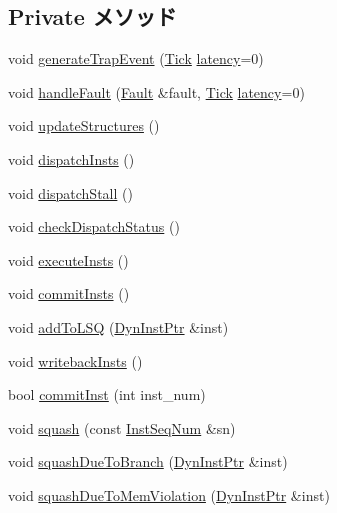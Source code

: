 \subsection*{Private メソッド}
\begin{DoxyCompactItemize}
\item 
void \hyperlink{classLWBackEnd_a17fd6203f0789b68f99f618ea93ab6e0}{generateTrapEvent} (\hyperlink{base_2types_8hh_a5c8ed81b7d238c9083e1037ba6d61643}{Tick} \hyperlink{classLWBackEnd_a9c5bf07170b5d91cfb44d4bfd0517128}{latency}=0)
\item 
void \hyperlink{classLWBackEnd_af3d02b2950c0aaa8cd71d422abd0ef51}{handleFault} (\hyperlink{classRefCountingPtr}{Fault} \&fault, \hyperlink{base_2types_8hh_a5c8ed81b7d238c9083e1037ba6d61643}{Tick} \hyperlink{classLWBackEnd_a9c5bf07170b5d91cfb44d4bfd0517128}{latency}=0)
\item 
void \hyperlink{classLWBackEnd_a1107d388cfcea92a9043608346ce98f0}{updateStructures} ()
\item 
void \hyperlink{classLWBackEnd_ac3f94deccc87588d728716efc4dd7ce8}{dispatchInsts} ()
\item 
void \hyperlink{classLWBackEnd_a3a69629e2b050560eb983bdedffc30ba}{dispatchStall} ()
\item 
void \hyperlink{classLWBackEnd_aee5c9997a61eb30564062dcdbda8c246}{checkDispatchStatus} ()
\item 
void \hyperlink{classLWBackEnd_a2d00e30d66a56e4667e28df302c98ac0}{executeInsts} ()
\item 
void \hyperlink{classLWBackEnd_ac8b85fbfdf330d000c094a9d1886d264}{commitInsts} ()
\item 
void \hyperlink{classLWBackEnd_a1b9c2184abc4f4e7a00285130f39bf26}{addToLSQ} (\hyperlink{classLWBackEnd_a028ce10889c5f6450239d9e9a7347976}{DynInstPtr} \&inst)
\item 
void \hyperlink{classLWBackEnd_a5e9a203f943b3a8a243ddc6d2a0a240d}{writebackInsts} ()
\item 
bool \hyperlink{classLWBackEnd_a300f33ed45badc3c856983b1b7469955}{commitInst} (int inst\_\-num)
\item 
void \hyperlink{classLWBackEnd_adc9b67ce59b0b2e930cfaf6361ce42c5}{squash} (const \hyperlink{inst__seq_8hh_a258d93d98edaedee089435c19ea2ea2e}{InstSeqNum} \&sn)
\item 
void \hyperlink{classLWBackEnd_a05c89a1532adb13cc0632fc3bb600add}{squashDueToBranch} (\hyperlink{classLWBackEnd_a028ce10889c5f6450239d9e9a7347976}{DynInstPtr} \&inst)
\item 
void \hyperlink{classLWBackEnd_a493d3b3596dc6e17cc56990a4e71602d}{squashDueToMemViolation} (\hyperlink{classLWBackEnd_a028ce10889c5f6450239d9e9a7347976}{DynInstPtr} \&inst)

\end{DoxyCompactItemize}
